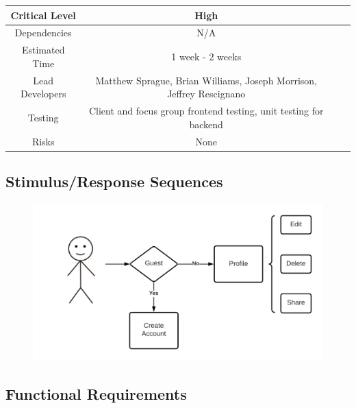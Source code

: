 \documentclass{scrreprt}
\begin{document}
\begin{center}
    \begin{tabular}{| c | c | c | c |}
        \hline
        Critical Level  & High                                                                 \\
        \hline
        Dependencies    & N/A                                                                  \\
        \hline
        Estimated Time  & 1 week - 2 weeks                                                     \\
        \hline
        Lead Developers & Matthew Sprague, Brian Williams, Joseph Morrison, Jeffrey Rescignano \\
        \hline
        Testing         & Client and focus group frontend testing, unit testing for backend    \\
        \hline
        Risks           & None                                                                 \\
        \hline
    \end{tabular}
\end{center}

\subsection{Stimulus/Response Sequences}

\begin{figure}[H]\centering
    \includegraphics[width=\columnwidth]{FlowCharts/Recipe-Creation.png}
\end{figure}

\subsection{Functional Requirements}
\end{document}
